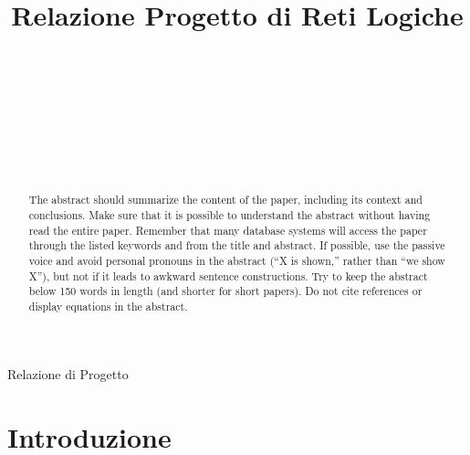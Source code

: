 \documentclass{article}
\begin{document}
\title{Relazione Progetto di Reti Logiche%
%
}

\author{\\[2pt] 
\\
\\
\and
\\
\\
\\
}

%
%
{Relazione di Progetto} 

\maketitle

\begin{abstract}
The abstract should summarize the content of the paper, including its context and conclusions. Make sure that it is possible to understand
the abstract without having read the entire paper. Remember that many database systems will access the paper through the listed keywords and from
the title and abstract. If possible, use the passive voice and avoid personal pronouns in the abstract ({``}X is shown,{''} rather than {``}we show
X{''}), but not if it leads to awkward sentence constructions. Try to keep the abstract below 150 words in length (and shorter for short papers).
Do not cite references or display equations in the abstract.
\end{abstract}


\section{Introduzione}
\label{intro}
\end{document}
